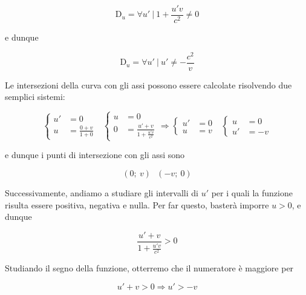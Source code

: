 \documentclass{article}
\begin{document}
\begin{equation}
    \mathrm{D}_u = \forall u'\ |\ 1 + \frac{u'v}{c^2} \neq 0
\end{equation}

e dunque

\begin{equation}
    \mathrm{D}_u = \forall u'\ |\ u' \neq - \frac{c^2}{v}
\end{equation}

Le intersezioni della curva con gli assi possono essere calcolate
risolvendo due semplici sistemi:

\begin{equation}
    \left\{
        \begin{aligned}
        u' &= 0 \\
        u &= \frac{0 + v}{1 + 0}
        \end{aligned}
    \right.
    \ \ \
    \left\{
        \begin{aligned}
        u &= 0 \\
        0 &= \frac{u' + v}{1 + \frac{u'v}{c^2}}
        \end{aligned}
    \right.
    \Rightarrow
    \left\{
        \begin{aligned}
        u' &= 0 \\
        u &= v
        \end{aligned}
    \right.
    \ \ \
    \left\{
        \begin{aligned}
        u &= 0 \\
        u' &= -v
        \end{aligned}
    \right.
\end{equation}

e dunque i punti di intersezione con gli assi sono

\begin{equation}
    (0;\ v)\ \ \ (-v;\ 0)
\end{equation}

Successivamente, andiamo a studiare gli intervalli di \(u'\)
per i quali la funzione risulta essere positiva, negativa e nulla. Per
far questo, basterà imporre \(u > 0\), e dunque

\begin{equation}
    \frac{u' + v}{1 + \frac{u'v}{c^2}} > 0
\end{equation}

Studiando il segno della funzione, otterremo che il numeratore
è maggiore per

\begin{equation}
    u' + v > 0 \Rightarrow u ' > -v
\end{equation}
\end{document}
